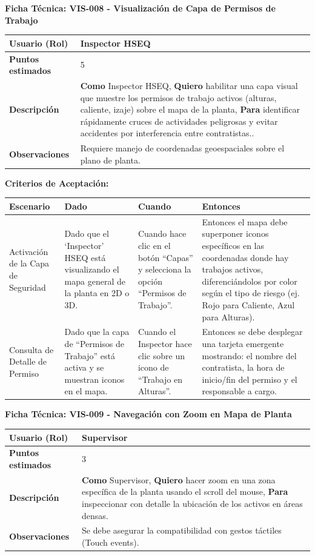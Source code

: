 \noindent
\textbf{Ficha Técnica: VIS-008 - Visualización de Capa de Permisos de Trabajo}
\footnotesize
\begin{longtable}{|p{}|p{}|}
\hline
\textbf{Usuario (Rol)} & Inspector HSEQ \\ \hline
\textbf{Puntos estimados} & 5 \\ \hline
\textbf{Descripción} & \textbf{Como} Inspector HSEQ, \textbf{Quiero} habilitar una capa visual que muestre los permisos de trabajo activos (alturas, caliente, izaje) sobre el mapa de la planta, \textbf{Para} identificar rápidamente cruces de actividades peligrosas y evitar accidentes por interferencia entre contratistas.. \\ \hline
\textbf{Observaciones} & Requiere manejo de coordenadas geoespaciales sobre el plano de planta. \\ \hline
\end{longtable}
\normalsize

\noindent
\textbf{Criterios de Aceptación:}
\footnotesize
\begin{longtable}{|p{}|p{}|p{}|p{}|}
\hline
\textbf{Escenario} & \textbf{Dado} & \textbf{Cuando} & \textbf{Entonces} \\ \hline
\endhead
Activación de la Capa de Seguridad & Dado que el `Inspector' HSEQ está visualizando el mapa general de la planta en 2D o 3D. & Cuando hace clic en el botón ``Capas'' y selecciona la opción ``Permisos de Trabajo''. & Entonces el mapa debe superponer iconos específicos en las coordenadas donde hay trabajos activos, diferenciándolos por color según el tipo de riesgo (ej. Rojo para Caliente, Azul para Alturas). \\ \hline
Consulta de Detalle de Permiso & Dado que la capa de ``Permisos de Trabajo'' está activa y se muestran iconos en el mapa. & Cuando el Inspector hace clic sobre un icono de ``Trabajo en Alturas''. & Entonces se debe desplegar una tarjeta emergente mostrando: el nombre del contratista, la hora de inicio/fin del permiso y el responsable a cargo. \\ \hline
\end{longtable}
\normalsize

\noindent
\textbf{Ficha Técnica: VIS-009 - Navegación con Zoom en Mapa de Planta}
\footnotesize
\begin{longtable}{|p{}|p{}|}
\hline
\textbf{Usuario (Rol)} & Supervisor \\ \hline
\textbf{Puntos estimados} & 3 \\ \hline
\textbf{Descripción} & \textbf{Como} Supervisor, \textbf{Quiero} hacer zoom en una zona específica de la planta usando el scroll del mouse, \textbf{Para} inspeccionar con detalle la ubicación de los activos en áreas densas. \\ \hline
\textbf{Observaciones} & Se debe asegurar la compatibilidad con gestos táctiles (Touch events). \\ \hline
\end{longtable}
\normalsize

